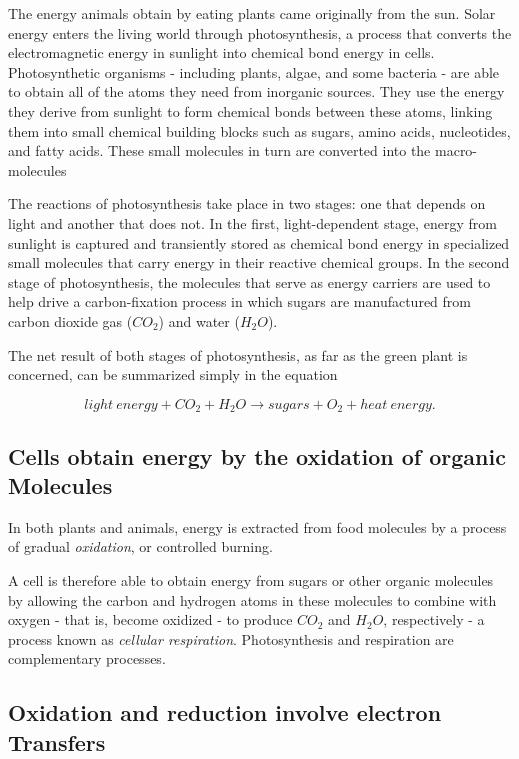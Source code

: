 The energy animals obtain by eating plants came originally from the sun.
Solar energy enters the living world through photosynthesis, a process
that converts the electromagnetic energy in sunlight into chemical bond
energy in cells. Photosynthetic organisms - including plants, algae, and
some bacteria - are able to obtain all of the atoms they need from inorganic sources.
They use the energy they derive from sunlight
to form chemical bonds between these atoms, linking them into small
chemical building blocks such as sugars, amino acids, nucleotides, and
fatty acids. These small molecules in turn are converted into the macro-molecules

The reactions of photosynthesis take place in two stages: one that
depends on light and another that does not. In the first, light-dependent
stage, energy from sunlight is captured and transiently stored
as chemical bond energy in specialized small molecules that carry energy
in their reactive chemical groups.
In the second stage of photosynthesis, the molecules that serve as energy
carriers are used to help drive a carbon-fixation process in which sugars
are manufactured from carbon dioxide gas ($CO_{2}$) and water ($H_{2}O$).

The net result of both stages of photosynthesis, as far as the green plant
is concerned, can be summarized simply in the equation

\begin{equation}
light \  energy + CO_{2} + H_{2}O \rightarrow sugars + O_{2} + heat \ energy.
\end{equation}

\subsection{Cells obtain energy by the oxidation of organic Molecules}

In both plants and
animals, energy is extracted from food molecules by a process of gradual
\textit{oxidation}, or controlled burning.

A cell is therefore able to obtain energy from sugars or other
organic molecules by allowing the carbon and hydrogen atoms in these
molecules to combine with oxygen - that is, become oxidized - to produce
$CO_{2}$ and $H_{2}O$, respectively - a process known as \textit{cellular respiration}.
Photosynthesis and respiration are complementary processes.

\subsection{Oxidation and reduction involve electron Transfers}

